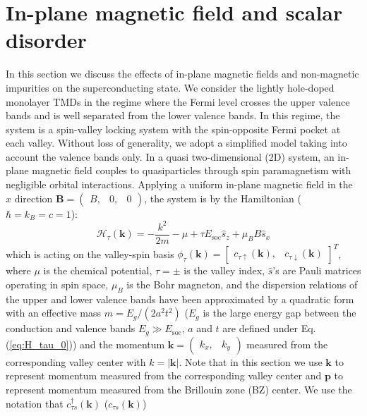 \section{In-plane magnetic field and scalar disorder}

In this section we discuss the effects of in-plane magnetic fields
and non-magnetic impurities on the superconducting state.
We consider the lightly hole-doped monolayer TMDs in the regime
where the Fermi level crosses the upper valence bands
and is well separated from the lower valence bands.
In this regime, the system is a spin-valley locking
system with the spin-opposite Fermi pocket at each valley.
Without loss of generality, we adopt a simplified model taking
into account the valence bands only.
In a quasi two-dimensional (2D)
system, an in-plane magnetic field couples to quasiparticles through
spin paramagnetism with negligible orbital interactions.
Applying a uniform in-plane magnetic field in the $x$ direction
$\mathbf{B}=(\begin{array}{ccc}
B, & 0, & 0\end{array})$, the system is by the Hamiltonian ($\hbar=k_{B}=c=1$):
\begin{equation}
\mathcal{H}_{\tau}(\mathbf{k})=-\frac{k^{2}}{2m}-\mu+\tau E_{\text{soc}}\hat{s}_{z}+\mu_{B}B\hat{s}_{x}\label{eq: valley_Hamiltonian}
\end{equation}
which is acting on the valley-spin basis
$\phi_{\tau}(\mathbf{k})=\left[\begin{array}{cc}
c_{\tau\uparrow}(\mathbf{k}), & c_{\tau\downarrow}(\mathbf{k})\end{array}\right]^{T}$,
where $\mu$ is the chemical potential, $\tau=\pm$ is the valley
index, $\hat{s}$'s are Pauli matrices operating in spin space, $\mu_{B}$
is the Bohr magneton, and the dispersion relations of the upper and
lower valence bands have been approximated by a quadratic form with
an effective mass $m=E_{g}/\left(2a^{2}t^{2}\right)$ ($E_{g}$ is the large energy gap between the conduction and valence bands $E_{g}\gg E_{\text{soc}}$, $a$ and $t$ are defined under Eq. (\ref{eq:H_tau_0})) and the momentum $\mathbf{k}=\left(\begin{array}{cc}
k_{x}, & k_{y}\end{array}\right)$ measured from the corresponding valley center with $k=|\mathbf{k}|$.
Note that in this section we use $\mathbf{k}$ to represent momentum
measured from the corresponding valley center and $\mathbf{p}$ to
represent momentum measured from the Brillouin zone (BZ) center.
We use the notation that $c_{\tau s}^{\dagger}(\mathbf{k})$ ($c_{\tau s}(\mathbf{k})$)
